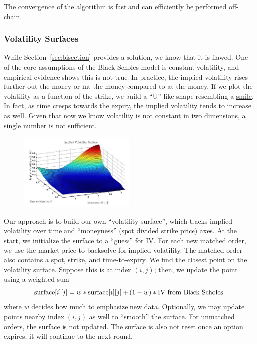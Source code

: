 \documentclass{article}
\begin{document}
\noindent The convergence of the algorithm is fast and can efficiently be performed off-chain. 

\subsubsection{Volatility Surfaces} 
\label{sec:surfaces}

While Section~\ref{sec:bisection} provides a solution, we know that it is flawed. One of the core assumptions of the Black Scholes model is constant volatility, and empirical evidence shows this is not true. In practice, the implied volatility rises further out-the-money or int-the-money compared to at-the-money. If we plot the volatility as a function of the strike, we build a ``U''-like shape resembling a \href{https://en.wikipedia.org/wiki/Volatility_smile}{smile}. In fact, as time creeps towards the expiry, the implied volatility tends to increase as well. Given that now we know volatility is not constant in two dimensions, a single number is not sufficient.\\

\begin{figure}[h]
\centering
\includegraphics[width=0.5\textwidth]{images/slope.png}
\end{figure}

\noindent Our approach is to build our own ``volatility surface'', which tracks implied volatility over time and ``moneyness'' (spot divided strike price) axes. At the start, we initialize the surface to a ``guess'' for IV. For each new matched order, we use the market price to backsolve for implied volatility. The matched order also contains a spot, strike, and time-to-expiry. We find the closest point on the volatility surface. Suppose this is at index $(i, j)$; then, we update the point using a weighted sum
\begin{equation}
    \textup{surface}[i][j] = w * \textup{surface}[i][j] + (1-w) * \textup{IV from Black-Scholes}
\end{equation}
where $w$ decides how much to emphasize new data. Optionally, we may update points nearby index $(i,j)$ as well to ``smooth'' the surface. For unmatched orders, the surface is not updated. The surface is also not reset once an option expires; it will continue to the next round. \\
\end{document}
